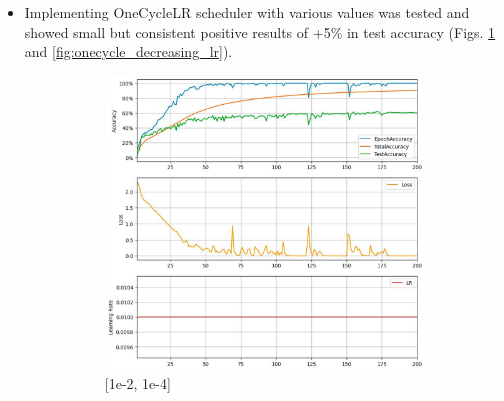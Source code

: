 \documentclass[11pt, a4paper, oneside]{assets/tex/thesis} %
\begin{document}
{\begin{itemize}
    Later with a test sample these yielded the following accuracies:
    \begin{itemize} 
        \item 1e-2 → 62.3%
        \item 8e-3 → 54.7%
        \item 5e-3 → 54.5%
    \end{itemize}

    \item Implementing OneCycleLR scheduler \cite{smith2018superconvergence} with various values was tested and showed small but consistent positive results of +5\% in test accuracy (Figs. \ref{fig:onecycle_stable_lr} and \ref{fig:onecycle_decreasing_lr}).
    
    \begin{figure}[h]
        \centering
        \begin{subfigure}[b]{0.5\textwidth}
            \centering
            \includegraphics[width=\textwidth]{assets/img/onecycle_stable_lr.png}
            \caption{[1e-2, 1e-4]}
            \label{fig:onecycle_stable_lr}
        \end{subfigure}%
        \hfill
        \begin{subfigure}[b]{0.5\textwidth}
            \centering

\end{subfigure}
\end{figure}
\end{itemize}}
\end{document}
